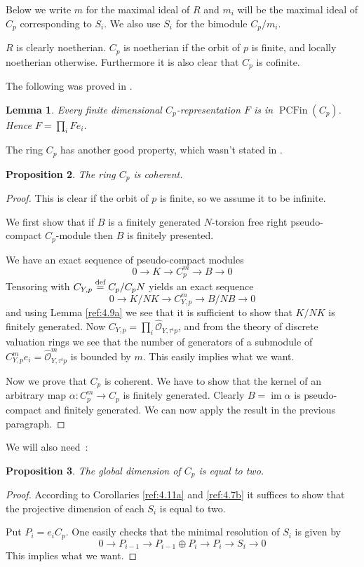 \documentclass{amsproc}
\def\Oscr{{\mathcal O}}
\def\im{\operatorname {im}}
\def\r{\rightarrow}
\let\oldtext\text
\def\text#1{\oldtext{\upshape #1}}
\DeclareMathOperator{\PCFin}{PCFin}
\newtheorem{lemmas}{Lemma}[subsection]
\newtheorem{propositions}[lemmas]{Proposition}
\theoremstyle{definition}
\theoremstyle{remark}
\numberwithin{equation}{section}
\numberwithin{table}{section}
\numberwithin{figure}{section}
\begin{document}
Below we write $m$ for the maximal ideal of $R$ and $m_i$ will be the
maximal ideal of $C_p$ corresponding to $S_i$. We also use $S_i$ for the
bimodule $C_p/m_i$.


$R$ is clearly noetherian. $C_p$ is noetherian if the orbit of $p$ is
finite, and locally noetherian otherwise.  Furthermore it is also
clear that $C_p$ is cofinite.



The following was proved in \cite[Thm 1.1.4]{VdBVG}.
\begin{lemmas} Every finite dimensional $C_p$-representation $F$
 is in $\PCFin(C_p)$. Hence $F=\prod_i Fe_i$.
\end{lemmas}
The ring $C_p$ has another good
property, which wasn't stated in \cite{VdBVG}.
\begin{propositions}
\label{ref:5.1.6a}
The ring $C_p$ is coherent.
\end{propositions}
\begin{proof}
This is clear if the orbit of $p$ is finite, so we assume it to be
infinite.

We first show that if $B$ is a finitely generated $N$-torsion free right
pseudo-compact $C_p$-module then $B$ is finitely presented.

 We have an exact sequence of pseudo-compact modules
\[
0\r K\r C_p^m \r B\r 0
\]
Tensoring with $C_{Y,p}\overset{\text{def}}{=}C_p/C_pN$ yields an
exact sequence
\[
0\r K/NK \r C_{Y,p}^m \r B/NB\r 0
\]
and using Lemma \ref{ref:4.9a} we see that it is sufficient
to show that $K/NK$ is finitely generated. 
Now $C_{Y,p}=\prod_i \hat{\Oscr}_{Y,\tau^ip}$, and from the theory of
discrete valuation rings we see that the number of generators of a submodule  of
$C_{Y,p}^m e_i=\hat{\Oscr}_{Y,\tau^ip}^m$ is bounded by $m$. This easily
implies what we want. 

Now we prove that $C_p$ is coherent.
 We have to show that the kernel of an arbitrary map $\alpha:
C_p^m\r C_p$ is finitely generated. Clearly $B=\im \alpha$ is
pseudo-compact and finitely generated. We can now apply  the
result in the previous paragraph.
\end{proof}
We will also need~:
\begin{propositions}
\label{ref:5.1.7a}
The global  dimension of $C_p$ is equal to two.
\end{propositions}
\begin{proof}
According to Corollaries \ref{ref:4.11a}  and  \ref{ref:4.7b} it
suffices to show that the projective dimension of each $S_i$ is equal
to two.  

 Put $P_i=e_iC_p$. One easily
checks that the minimal resolution of $S_i$ is given by
\[
0\r P_{i-1}\r P_{i-1}\oplus P_i\r P_i\r S_i\r 0
\]
This implies what we want.
\end{proof}
\end{document}
